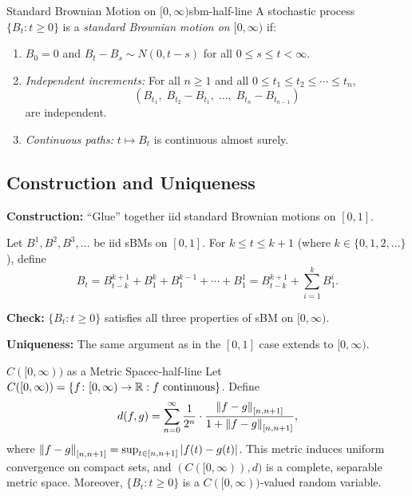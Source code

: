 \begin{definition}{Standard Brownian Motion on $[0,\infty)$}{sbm-half-line}
    A stochastic process $\{B_t : t \geq 0\}$ is a \emph{standard Brownian motion on $[0,\infty)$} if:
    \begin{enumerate}[label=(\roman*)]
        \item $B_0 = 0$ and $B_t - B_s \sim N(0, t - s)$ for all $0 \leq s \leq t < \infty$.
        \item \emph{Independent increments:} For all $n \geq 1$ and all $0 \leq t_1 \leq t_2 \leq \cdots \leq t_n$,
        \[
            (B_{t_1},\; B_{t_2} - B_{t_1},\; \ldots,\; B_{t_n} - B_{t_{n-1}})
        \]
        are independent.
        \item \emph{Continuous paths:} $t \mapsto B_t$ is continuous almost surely.
    \end{enumerate}
\end{definition}

\subsection{Construction and Uniqueness}

\textbf{Construction:} ``Glue'' together iid standard Brownian motions on $[0,1]$.

Let $B^1, B^2, B^3, \ldots$ be iid sBMs on $[0,1]$. For $k \leq t \leq k+1$ (where $k \in \{0,1,2,\ldots\}$), define
\[
    B_t = B^{k+1}_{t-k} + B^{k}_{1} + B^{k-1}_{1} + \cdots + B^{1}_{1}
    = B^{k+1}_{t-k} + \sum_{i=1}^{k} B^{i}_{1}.
\]

\textbf{Check:} $\{B_t : t \geq 0\}$ satisfies all three properties of sBM on $[0,\infty)$.

\textbf{Uniqueness:} The same argument as in the $[0,1]$ case extends to $[0,\infty)$.

\begin{remark}{$C([0,\infty))$ as a Metric Space}{c-half-line}
    Let $C([0,\infty)) = \{f \colon [0,\infty) \to \mathbb{R} : f \text{ continuous}\}$. Define
    \[
        d(f,g) = \sum_{n=0}^{\infty} \frac{1}{2^n} \cdot \frac{\left\|f - g\right\|_{[n,n+1]}}{1 + \left\|f - g\right\|_{[n,n+1]}},
    \]
    where $\left\|f - g\right\|_{[n,n+1]} = \sup_{t \in [n,n+1]} \left|f(t) - g(t)\right|$. This metric induces uniform convergence on compact sets, and $(C([0,\infty)), d)$ is a complete, separable metric space. Moreover, $\{B_t : t \geq 0\}$ is a $C([0,\infty))$-valued random variable.
\end{remark}

